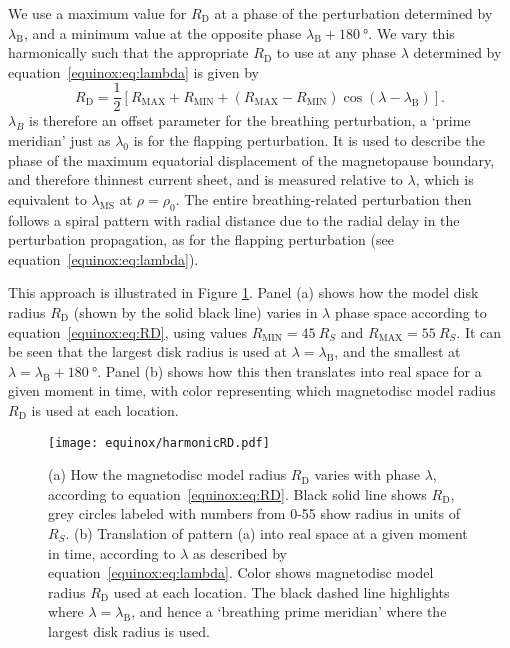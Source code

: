 We use a maximum value for $R_\mathrm{D}$ at a phase of the perturbation determined by $\lambda_\mathrm{B}$, and a minimum value at the opposite phase $\lambda_\mathrm{B}+\SI{180}{\degree}$. We vary this harmonically such that the appropriate $R_\mathrm{D}$ to use at any phase $\lambda$ determined by equation~\ref{equinox:eq:lambda} is given by
\begin{equation}\label{equinox:eq:RD}
R_\mathrm{D} = \frac{1}{2}[ R_\mathrm{MAX}+R_\mathrm{MIN}+(R_\mathrm{MAX}-R_\mathrm{MIN})\cos{(\lambda - \lambda_\mathrm{B})}].
\end{equation}
$\lambda_B$ is therefore an offset parameter for the breathing perturbation, a `prime meridian' just as $\lambda_0$ is for the flapping perturbation. It is used to describe the phase of the maximum equatorial displacement of the magnetopause boundary, and therefore thinnest current sheet, and is measured relative to $\lambda$, which is equivalent to $\lambda_\mathrm{MS}$ at $\rho=\rho_0$. The entire breathing-related perturbation then follows a spiral pattern with radial distance due to the radial delay in the perturbation propagation, as for the flapping perturbation (see equation~\ref{equinox:eq:lambda}).

This approach is illustrated in Figure \ref{equinox:fig:harmonicRD}. Panel (a) shows how the model disk radius $R_\mathrm{D}$ (shown by the solid black line) varies in $\lambda$ phase space according to equation~\ref{equinox:eq:RD}, using values $R_\mathrm{MIN}=\SI{45}{R_S}$ and $R_\mathrm{MAX}=\SI{55}{R_S}$. It can be seen that the largest disk radius is used at $\lambda=\lambda_\mathrm{B}$, and the smallest at $\lambda=\lambda_\mathrm{B}+\SI{180}{\degree}$. Panel (b) shows how this then translates into real space for a given moment in time, with color representing which magnetodisc model radius $R_\mathrm{D}$ is used at each location.
\begin{figure}
\centering
\texttt{[image: equinox/harmonicRD.pdf]}
\caption[Diagram showing how magnetodisc model radius $R_\mathrm{D}$ varies with phase, to represent breathing.]{(a) How the magnetodisc model radius $R_\mathrm{D}$ varies with phase $\lambda$, according to equation~\ref{equinox:eq:RD}. Black solid line shows $R_\mathrm{D}$, grey circles labeled with numbers from 0-55 show radius in units of $\si{R_S}$. (b) Translation of pattern (a) into real space at a given moment in time, according to $\lambda$ as described by equation~\ref{equinox:eq:lambda}. Color shows magnetodisc model radius $R_\mathrm{D}$ used at each location. The black dashed line highlights where $\lambda=\lambda_\mathrm{B}$, and hence a `breathing prime meridian' where the largest disk radius is used.}
\label{equinox:fig:harmonicRD}
\end{figure}

